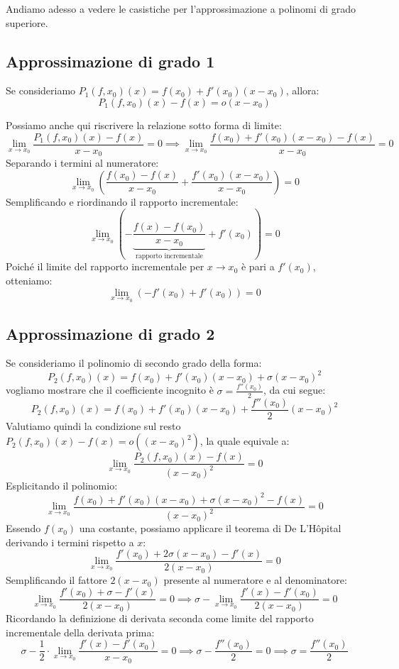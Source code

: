 \documentclass[12pt]{report}
\begin{document}
	Andiamo adesso a vedere le casistiche per l'approssimazione a polinomi di grado superiore.
	
	\subsection{Approssimazione di grado 1}
	
	Se consideriamo $P_1(f, x_0)(x) = f(x_0) + f'(x_0)(x - x_0)$, allora:
	\[
	P_1(f, x_0)(x) - f(x) = o(x - x_0)
	\]
	
	Possiamo anche qui riscrivere la relazione sotto forma di limite:
	\[
	\lim_{x \to x_0} \frac{P_1(f, x_0)(x) - f(x)}{x - x_0} = 0 \implies \lim_{x \to x_0} \frac{f(x_0) + f'(x_0)(x - x_0) - f(x)}{x - x_0} = 0
	\]
	Separando i termini al numeratore:
	\[
	\lim_{x \to x_0} \left( \frac{f(x_0) - f(x)}{x - x_0} + \frac{f'(x_0)(x - x_0)}{x - x_0} \right) = 0
	\]
	Semplificando e riordinando il rapporto incrementale:
	\[
	\lim_{x \to x_0} \left( - \underbrace{\frac{f(x) - f(x_0)}{x - x_0}}_{\text{rapporto incrementale}} + f'(x_0) \right) = 0
	\]
	Poiché il limite del rapporto incrementale per $x \to x_0$ è pari a $f'(x_0)$, otteniamo:
	\[
	\lim_{x \to x_0} \left( -f'(x_0) + f'(x_0) \right) = 0
	\]
	
	\subsection{Approssimazione di grado 2}
	
	Se consideriamo il polinomio di secondo grado della forma:
	\[
	P_2(f, x_0)(x) = f(x_0) + f'(x_0)(x - x_0) + \sigma (x - x_0)^2
	\]
	vogliamo mostrare che il coefficiente incognito è $\sigma = \frac{f''(x_0)}{2}$, da cui segue:
	\[
	P_2(f, x_0)(x) = f(x_0) + f'(x_0)(x - x_0) + \frac{f''(x_0)}{2} (x - x_0)^2
	\]
	Valutiamo quindi la condizione sul resto $P_2(f, x_0)(x) - f(x) = o((x - x_0)^2)$, la quale equivale a:
	\[
	\lim_{x \to x_0} \frac{P_2(f, x_0)(x) - f(x)}{(x - x_0)^2} = 0
	\]
	Esplicitando il polinomio:
	\[
	\lim_{x \to x_0} \frac{f(x_0) + f'(x_0)(x - x_0) + \sigma (x - x_0)^2 - f(x)}{(x - x_0)^2} = 0
	\]
	Essendo $f(x_0)$ una costante, possiamo applicare il teorema di De L'Hôpital derivando i termini rispetto a $x$:
	\[
	\lim_{x \to x_0} \frac{f'(x_0) + 2\sigma(x - x_0) - f'(x)}{2(x - x_0)} = 0
	\]
	Semplificando il fattore $2(x - x_0)$ presente al numeratore e al denominatore:
	\[
	\lim_{x \to x_0} \frac{f'(x_0) + \sigma - f'(x)}{2(x - x_0)} = 0 \implies \sigma - \lim_{x \to x_0} \frac{f'(x) - f'(x_0)}{2(x - x_0)} = 0
	\]
	Ricordando la definizione di derivata seconda come limite del rapporto incrementale della derivata prima:
	\[
	\sigma - \frac{1}{2} \cdot \lim_{x \to x_0} \frac{f'(x) - f'(x_0)}{x - x_0} = 0 \implies \sigma - \frac{f''(x_0)}{2} = 0 \implies \sigma = \frac{f''(x_0)}{2}
	\]
	
\end{document}
